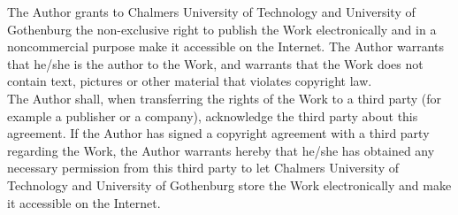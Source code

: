 

	
	


\newpage
\thispagestyle{plain}
The Author grants to Chalmers University of Technology and University of Gothenburg the non-exclusive right to publish the Work electronically and in a noncommercial purpose make it accessible on the Internet. The Author warrants that he/she is the author to the Work, and warrants that the Work does not contain text, pictures or other material that violates copyright law.\\
The Author shall, when transferring the rights of the Work to a third party (for example a publisher or a company), acknowledge the third party about this agreement. If the Author has signed a copyright agreement with a third party regarding the Work, the
Author warrants hereby that he/she has obtained any necessary permission from this third party to let Chalmers University of Technology and University of Gothenburg store the Work electronically and make it accessible on the Internet.

